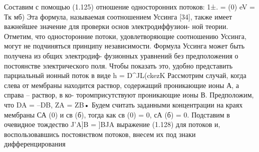 Составим с помощью (1.125) отношение односторонних потоков:
1±. = (0) eV =
Тк мб)
Эта формула, называемая соотношением Уссинга [34], также имеет важнейшее значение для проверки основ электродиффузион- ной теории. Отметим, что односторонние потоки, удовлетворяющие соотношению Уссинга, могут не подчиняться принципу независимости.
Формула Уссинга может быть получена из общих электродиф- фузионных уравнений без предположения о постоянстве электрического поля. Чтобы показать это, удобно представить парциальный ионный поток в виде
h = D^JL(ckezK%
Рассмотрим случай, когда слева от мембраны находится раствор, содержащий проникающие ионы А, а справа -- раствор, в ко- торомприсутствуют проникающие ионы В. Предположим, что DA = --DB, ZA = ZB• Будем считать заданными концентрации на краях мембраны СА (0) и св (б), тогда как св (0) = 0, сА (б) = 0. Подставим в очевидное тождество J'A]B = ]BJA выражение (1.128) для потоков
и, воспользовавшись постоянством потоков, внесем их под знаки дифференцирования
